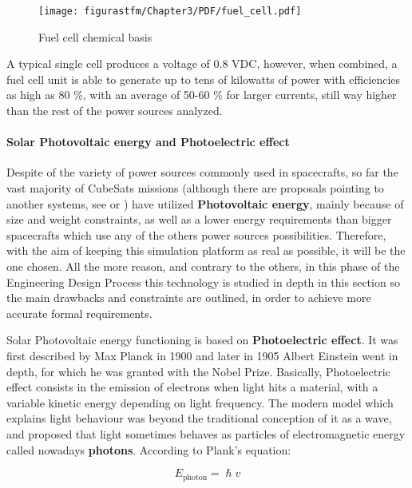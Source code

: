 			\begin{figure}[H] 
				\centering
				\texttt{[image: figurastfm/Chapter3/PDF/fuel\_cell.pdf]}
				\caption{Fuel cell chemical basis\cite{wiki}}      		
				\vspace{-0.5cm}
  		\end{figure}
			
			
A typical single cell produces a voltage of 0.8 VDC, however, when combined, a fuel cell unit is able to generate up to tens of kilowatts of power with efficiencies as high as 80 \%, with an average of 50-60 \% for larger currents, still way higher than the rest of the power sources analyzed. 

\paragraph{Solar Photovoltaic energy and Photoelectric effect} \label{solarcellsexpl}

Despite of the variety of power sources commonly used in spacecrafts, so far the vast majority of CubeSats missions (although there are proposals pointing to another systems, see \cite{glenn} or \cite{bristol}) have utilized \textbf{Photovoltaic energy}, mainly because of size and weight constraints, as well as a lower energy requirements than bigger spacecrafts which use any of the others power sources possibilities. Therefore, with the aim of keeping this simulation platform as real as possible, it will be the one chosen.  All the more reason, and contrary to the others, in this phase of the Engineering Design Process this technology is studied in depth in this section so the main drawbacks and constraints are outlined, in order to achieve more accurate formal requirements.	


Solar Photovoltaic energy functioning is based on \textbf{Photoelectric effect}. It was first described by Max Planck in 1900 and later in 1905 Albert Einstein went in depth, for which he was granted with the Nobel Prize. Basically, Photoelectric effect consists in the emission of electrons when light hits a material, with a variable kinetic energy depending on light frequency. The modern model which explains light behaviour was beyond the traditional conception of it as a wave, and proposed that light sometimes behaves as particles of electromagnetic energy called nowadays \textbf{photons}. According to Plank's equation:

	\begin{equation} \label{eq:plank}
			E_{\text{photon}}=\hslash v
	\end{equation}
	
